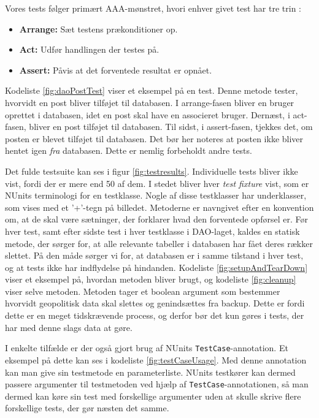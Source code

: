 Vores tests følger primært AAA-mønstret, hvori enhver givet test har tre trin \cite{ArrangeActAssert}:
\begin{itemize}
    \item \textbf{Arrange:} Sæt testens prækonditioner op.
    \item \textbf{Act:} Udfør handlingen der testes på.
    \item \textbf{Assert:} Påvis at det forventede resultat er opnået.
\end{itemize}
Kodeliste \ref{fig:daoPostTest} viser et eksempel på en test. Denne metode tester, hvorvidt en post bliver tilføjet til databasen. I arrange-fasen bliver en bruger oprettet i databasen, idet en post skal have en associeret bruger. Dernæst, i act-fasen, bliver en post tilføjet til databasen. Til sidst, i assert-fasen, tjekkes det, om posten er blevet tilføjet til databasen. Det bør her noteres at posten ikke bliver hentet igen \textit{fra} databasen. Dette er nemlig forbeholdt andre tests.

Det fulde testsuite kan ses i figur \ref{fig:testresults}. Individuelle tests bliver ikke vist, fordi der er mere end 50 af dem. I stedet bliver hver \textit{test fixture} vist, som er NUnits terminologi for en testklasse. Nogle af disse testklasser har underklasser, som vises med et '+'-tegn på billedet. Metoderne er navngivet efter en konvention om, at de skal være sætninger, der forklarer hvad den forventede opførsel er. Før hver test, samt efter sidste test i hver testklasse i DAO-laget, kaldes en statisk metode, der sørger for, at alle relevante tabeller i databasen har fået deres rækker slettet. På den måde sørger vi for, at databasen er i samme tilstand i hver test, og at tests ikke har indflydelse på hindanden. Kodeliste \ref{fig:setupAndTearDown} viser et eksempel på, hvordan metoden bliver brugt, og kodeliste \ref{fig:cleanup} viser selve metoden. Metoden tager et boolean argument som bestemmer hvorvidt geopolitisk data skal slettes og genindsættes fra backup. Dette er fordi dette er en meget tidskrævende process, og derfor bør det kun gøres i tests, der har med denne slags data at gøre.

I enkelte tilfælde er der også gjort brug af NUnits \texttt{TestCase}-annotation. Et eksempel på dette kan ses i kodeliste \ref{fig:testCaseUsage}. Med denne annotation kan man give sin testmetode en parameterliste. NUnits testkører kan dermed passere argumenter til testmetoden ved hjælp af \texttt{TestCase}-annotationen, så man dermed kan køre sin test med forskellige argumenter uden at skulle skrive flere forskellige tests, der gør næsten det samme.

